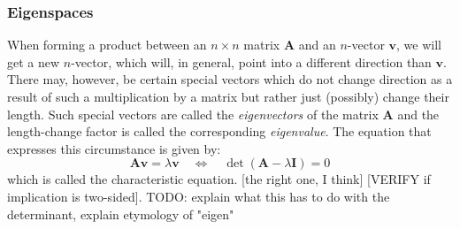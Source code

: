 %





\subsubsection{Eigenspaces}
When forming a product between an $n \times n$ matrix $\mathbf{A}$ and an $n$-vector $\mathbf{v}$, we will get a new $n$-vector, which will, in general, point into a different direction than  $\mathbf{v}$. There may, however, be certain special vectors which do not change direction as a result of such a multiplication by a matrix but rather just (possibly) change their length. Such special vectors are called the \emph{eigenvectors} of the matrix $\mathbf{A}$ and the length-change factor is called the corresponding \emph{eigenvalue}. The equation that expresses this circumstance is given by:
\begin{equation}
 \mathbf{A v} = \lambda \mathbf{v}  
 \quad \Leftrightarrow \quad
 \det ( \mathbf{A} - \lambda \mathbf{I} ) = 0
\end{equation}
which is called the characteristic equation. [the right one, I think]
[VERIFY if implication is two-sided]. TODO: explain what this has to do with the determinant, explain etymology of "eigen"


